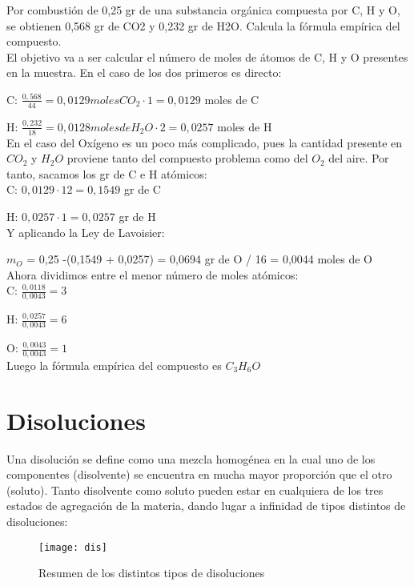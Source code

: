 \begin{exercise}
	Por combustión de 0,25 gr de una substancia orgánica compuesta por C, H y O, se obtienen 0,568 gr de CO2 y 0,232 gr de H2O. Calcula la fórmula empírica del compuesto.\\
	
	El objetivo va a ser calcular el número de moles de átomos de C, H y O presentes en la muestra. En el caso de los dos primeros es directo:
	
	C: $\frac{0,568}{44}  = 0,0129 moles CO_2 \cdot 1 = 0,0129$ moles de C
	
	H: $\frac{0,232}{18} = 0,0128 moles de H_2O \cdot 2 = 0,0257$ moles de H\\
	
	En el caso del Oxígeno es un poco más complicado, pues la cantidad presente en $CO_2$ y $H_2O$ proviene tanto del compuesto problema como del $O_2$ del aire. Por tanto, sacamos los gr de C e H atómicos:\\
	
	C: $0,0129\cdot 12 = 0,1549$ gr de C
	
	H: $0,0257\cdot 1 = 0,0257$ gr de H\\
	
	Y aplicando la Ley de Lavoisier:
	
	$m_O$ = 0,25 -(0,1549 + 0,0257) = 0,0694 gr de O / 16 = 0,0044 moles de O\\
	
	Ahora dividimos entre el menor número de moles atómicos:\\
	
	C: $\frac{0,0118}{0,0043} = 3$
	
	H: $\frac{0,0257}{0,0043} = 6$
	
	O: $\frac{0,0043}{0,0043} = 1$\\
	
	Luego la fórmula empírica del compuesto es $C_3H_6O$
	
\end{exercise}

\section{Disoluciones}

Una disolución se define como una mezcla homogénea en la cual uno de los componentes (disolvente) se encuentra en mucha mayor proporción que el otro (soluto). Tanto disolvente como soluto pueden estar en cualquiera de los tres estados de agregación de la materia, dando lugar a infinidad de tipos distintos de disoluciones:\\

\begin{figure}[h!]
	\centering
	\texttt{[image: dis]}
	\caption{Resumen de los distintos tipos de disoluciones}
\end{figure}  
